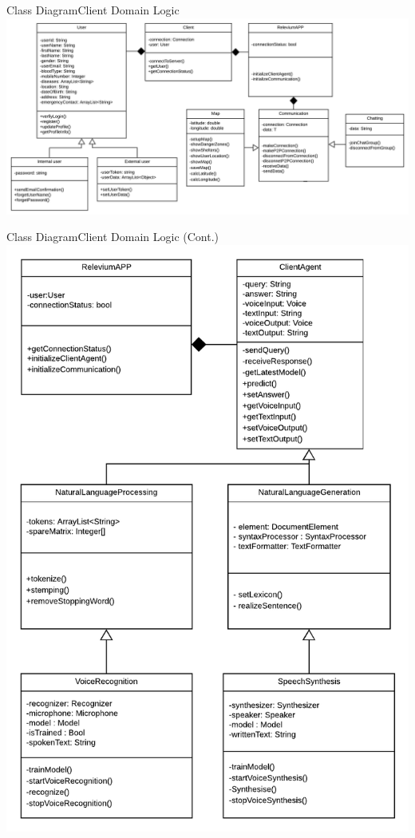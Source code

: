 \documentclass{beamer}
\begin{document}
\begin{frame}{Class Diagram}{Client Domain Logic}
    \includegraphics[width=.9\linewidth]{img3/ClassDiagram1.pdf}
\end{frame}

\begin{frame}{Class Diagram}{Client Domain Logic (Cont.)}
    \centering\includegraphics[height=.7\textheight]{img3/ClassDClass1DIV.pdf}
\end{frame}
\end{document}
